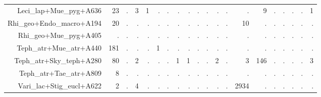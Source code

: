 \documentclass[a4paper, 11]{article}\usepackage[]{graphicx}\usepackage[]{color}
\begin{document}
\begin{table}
\begin{tabular}{rrrrrrrrrrrrrrrrrrrr}
  Leci\_lap+Mue\_pyg+A636 & 23 & . & 3 & 1 & . & . & . & . & . & . & . & . & . & 9 & . & . & . & . & 1 \\ 
  Rhi\_geo+Endo\_macro+A194 & 20 & . & . & . & . & . & . & . & . & . & . & . & 10 & . & . & . & . & . & . \\ 
  Rhi\_geo+Mue\_pyg+A405 & . & . & . & . & . & . & . & . & . & . & . & . & . & . & . & . & . & . & . \\ 
  Teph\_atr+Mue\_atr+A440 & 181 & . & . & . & 1 & . & . & . & . & . & . & . & . & . & . & . & . & . & . \\ 
  Teph\_atr+Sky\_teph+A280 & 80 & . & 2 & . & . & . & 1 & 1 & . & . & 2 & . & 3 & 146 & . & . & . & . & 3 \\ 
  Teph\_atr+Tae\_atr+A809 & 8 & . & . & . & . & . & . & . & . & . & . & . & . & . & . & . & . & . & . \\ 
  Vari\_lac+Stig\_eucl+A622 & 2 & . & 4 & . & . & . & . & . & . & . & . & . & 2934 & . & . & . & . & . & . \\ 
   \hline
\end{tabular}
\end{table}
\end{document}
